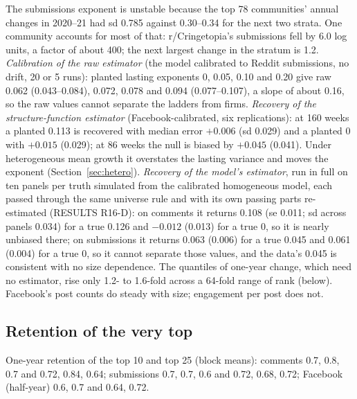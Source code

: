 \documentclass[10pt]{article}
\begin{document}
The submissions exponent is unstable because the top 78 communities' annual changes in 2020--21 had sd 0.785 against 0.30--0.34 for the next two strata. One community accounts for most of that: r/Cringetopia's submissions fell by 6.0 log units, a factor of about 400; the next largest change in the stratum is 1.2. \emph{Calibration of the raw estimator} (the model calibrated to Reddit submissions, no drift, 20 or 5 runs): planted lasting exponents 0, 0.05, 0.10 and 0.20 give raw 0.062 (0.043--0.084), 0.072, 0.078 and 0.094 (0.077--0.107), a slope of about 0.16, so the raw values cannot separate the ladders from firms. \emph{Recovery of the structure-function estimator} (Facebook-calibrated, six replications): at 160 weeks a planted 0.113 is recovered with median error $+0.006$ (sd 0.029) and a planted 0 with $+0.015$ (0.029); at 86 weeks the null is biased by $+0.045$ (0.041). Under heterogeneous mean growth it overstates the lasting variance and moves the exponent (Section~\ref{sec:hetero}). \emph{Recovery of the model's estimator}, run in full on ten panels per truth simulated from the calibrated homogeneous model, each passed through the same universe rule and with its own passing parts re-estimated (RESULTS R16-D): on comments it returns 0.108 (se 0.011; sd across panels 0.034) for a true 0.126 and $-0.012$ (0.013) for a true 0, so it is nearly unbiased there; on submissions it returns 0.063 (0.006) for a true 0.045 and 0.061 (0.004) for a true 0, so it cannot separate those values, and the data's 0.045 is consistent with no size dependence. The quantiles of one-year change, which need no estimator, rise only 1.2- to 1.6-fold across a 64-fold range of rank (below). Facebook's post counts do steady with size; engagement per post does not.

\subsection{Retention of the very top}
One-year retention of the top 10 and top 25 (block means): comments 0.7, 0.8, 0.7 and 0.72, 0.84, 0.64; submissions 0.7, 0.7, 0.6 and 0.72, 0.68, 0.72; Facebook (half-year) 0.6, 0.7 and 0.64, 0.72.
\end{document}
